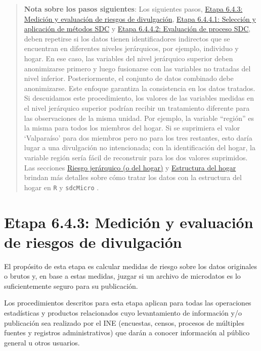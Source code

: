 \documentclass[]{book}
\theoremstyle{definition}
\theoremstyle{definition}
\theoremstyle{definition}
\theoremstyle{definition}
\theoremstyle{remark}
\begin{document}
\begin{quote}
\textbf{Nota sobre los pasos siguientes}:
Los siguientes pasos, \protect\hyperlink{etapa-6.4.3-mediciuxf3n-y-evaluaciuxf3n-de-riesgos-de-divulgaciuxf3n}{Etapa 6.4.3: Medición y evaluación de riesgos de divulgación}, \protect\hyperlink{etapa-6.4.4.1-selecciuxf3n-y-aplicaciuxf3n-de-muxe9todos-sdc}{Etapa 6.4.4.1: Selección y aplicación de métodos SDC} y \protect\hyperlink{etapa-6.4.4.2-evaluaciuxf3n-de-proceso-sdc}{Etapa 6.4.4.2: Evaluación de proceso SDC}, deben repetirse si los datos tienen identificadores indirectos que se encuentran en diferentes niveles jerárquicos, por ejemplo, individuo y hogar. En ese caso, las variables del nivel jerárquico superior deben anonimizarse primero y luego fusionarse con las variables no tratadas del nivel inferior. Posteriormente, el conjunto de datos combinado debe anonimizarse. Este enfoque garantiza la consistencia en los datos tratados. Si descuidamos este procedimiento, los valores de las variables medidas en el nivel jerárquico superior podrían recibir un tratamiento diferente para las observaciones de la misma unidad. Por ejemplo, la variable ``región'' es la misma para todos los miembros del hogar. Si se suprimiera el valor `Valparaíso' para dos miembros pero no para los tres restantes, esto daría lugar a una divulgación no intencionada; con la identificación del hogar, la variable región sería fácil de reconstruir para los dos valores suprimidos. Las secciones \protect\hyperlink{riesgo-jeruxe1rquico-o-del-hogar}{Riesgo jerárquico (o del hogar)} y \protect\hyperlink{estructura-del-hogar}{Estructura del hogar} brindan más detalles sobre cómo tratar los datos con la estructura del hogar en \texttt{R} y \texttt{sdcMicro} .
\end{quote}

\hypertarget{etapa-6.4.3-mediciuxf3n-y-evaluaciuxf3n-de-riesgos-de-divulgaciuxf3n}{%
\section{Etapa 6.4.3: Medición y evaluación de riesgos de divulgación}\label{etapa-6.4.3-mediciuxf3n-y-evaluaciuxf3n-de-riesgos-de-divulgaciuxf3n}}

El propósito de esta etapa es calcular medidas de riesgo sobre los datos originales o brutos y, en base a estas medidas, juzgar si un archivo de microdatos es lo suficientemente seguro para su publicación.

Los procedimientos descritos para esta etapa aplican para todas las operaciones estadísticas y productos relacionados cuyo levantamiento de información y/o publicación sea realizado por el INE (encuestas, censos, procesos de múltiples fuentes y registros administrativos) que darán a conocer información al público general u otros usuarios.
\end{document}
